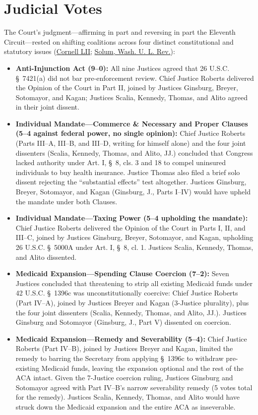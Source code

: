 \documentclass[12pt]{article}
\begin{document}
\section{Judicial Votes}
The Court's judgment---affirming in part and reversing in part the Eleventh Circuit---rested on shifting coalitions across four distinct constitutional and statutory issues (\href{https://www.law.cornell.edu/supremecourt/text/11-393}{Cornell LII}; \href{https://wustllawreview.org/wp-content/uploads/2021/10/91.1.1.pdf}{Solum, Wash. U. L. Rev.}):

\begin{itemize}
\item \textbf{Anti-Injunction Act (9--0):} All nine Justices agreed that 26 U.S.C. \S~7421(a) did not bar pre-enforcement review. Chief Justice Roberts delivered the Opinion of the Court in Part II, joined by Justices Ginsburg, Breyer, Sotomayor, and Kagan; Justices Scalia, Kennedy, Thomas, and Alito agreed in their joint dissent.
\item \textbf{Individual Mandate---Commerce \& Necessary and Proper Clauses (5--4 against federal power, no single opinion):} Chief Justice Roberts (Parts III--A, III--B, and III--D, writing for himself alone) and the four joint dissenters (Scalia, Kennedy, Thomas, and Alito, JJ.) concluded that Congress lacked authority under Art. I, \S~8, cls. 3 and 18 to compel uninsured individuals to buy health insurance. Justice Thomas also filed a brief solo dissent rejecting the ``substantial effects'' test altogether. Justices Ginsburg, Breyer, Sotomayor, and Kagan (Ginsburg, J., Parts I--IV) would have upheld the mandate under both Clauses.
\item \textbf{Individual Mandate---Taxing Power (5--4 upholding the mandate):} Chief Justice Roberts delivered the Opinion of the Court in Parts I, II, and III--C, joined by Justices Ginsburg, Breyer, Sotomayor, and Kagan, upholding 26 U.S.C. \S~5000A under Art. I, \S~8, cl. 1. Justices Scalia, Kennedy, Thomas, and Alito dissented.
\item \textbf{Medicaid Expansion---Spending Clause Coercion (7--2):} Seven Justices concluded that threatening to strip all existing Medicaid funds under 42 U.S.C. \S~1396c was unconstitutionally coercive: Chief Justice Roberts (Part IV--A), joined by Justices Breyer and Kagan (3-Justice plurality), plus the four joint dissenters (Scalia, Kennedy, Thomas, and Alito, JJ.). Justices Ginsburg and Sotomayor (Ginsburg, J., Part V) dissented on coercion.
\item \textbf{Medicaid Expansion---Remedy and Severability (5--4):} Chief Justice Roberts (Part IV--B), joined by Justices Breyer and Kagan, limited the remedy to barring the Secretary from applying \S~1396c to withdraw pre-existing Medicaid funds, leaving the expansion optional and the rest of the ACA intact. Given the 7-Justice coercion ruling, Justices Ginsburg and Sotomayor agreed with Part IV--B's narrow severability remedy (5 votes total for the remedy). Justices Scalia, Kennedy, Thomas, and Alito would have struck down the Medicaid expansion and the entire ACA as inseverable.
\end{itemize}
\end{document}
